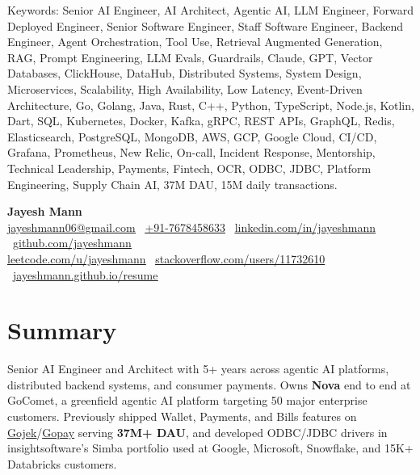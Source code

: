 \documentclass[11pt,letterpaper]{article}
\let\oldhref\href
\renewcommand{\href}[2]{\oldhref{#1}{\uline{#2}}}
\begin{document}
{\color{white}\fontsize{1pt}{1pt}\selectfont
Keywords: Senior AI Engineer, AI Architect, Agentic AI, LLM Engineer, Forward Deployed Engineer, Senior Software Engineer, Staff Software Engineer, Backend Engineer, Agent Orchestration, Tool Use, Retrieval Augmented Generation, RAG, Prompt Engineering, LLM Evals, Guardrails, Claude, GPT, Vector Databases, ClickHouse, DataHub, Distributed Systems, System Design, Microservices, Scalability, High Availability, Low Latency, Event-Driven Architecture, Go, Golang, Java, Rust, C++, Python, TypeScript, Node.js, Kotlin, Dart, SQL, Kubernetes, Docker, Kafka, gRPC, REST APIs, GraphQL, Redis, Elasticsearch, PostgreSQL, MongoDB, AWS, GCP, Google Cloud, CI/CD, Grafana, Prometheus, New Relic, On-call, Incident Response, Mentorship, Technical Leadership, Payments, Fintech, OCR, ODBC, JDBC, Platform Engineering, Supply Chain AI, 37M DAU, 15M daily transactions.}

\begin{center}
{\Huge\bfseries Jayesh Mann}\\[4pt]
\href{mailto:jayeshmann06@gmail.com}{jayeshmann06@gmail.com} \textbullet\
\href{tel:+917678458633}{+91-7678458633} \textbullet\
\href{https://linkedin.com/in/jayeshmann}{linkedin.com/in/jayeshmann} \textbullet\
\href{https://github.com/jayeshmann}{github.com/jayeshmann}\\
\href{https://leetcode.com/u/jayeshmann}{leetcode.com/u/jayeshmann} \textbullet\
\href{https://stackoverflow.com/users/11732610/jayesh-mann}{stackoverflow.com/users/11732610} \textbullet\
\href{https://jayeshmann.github.io/resume/}{jayeshmann.github.io/resume}
\end{center}

\section{Summary}
Senior AI Engineer and Architect with 5+ years across agentic AI platforms, distributed backend systems, and consumer payments. Owns \textbf{Nova} end to end at GoComet, a greenfield agentic AI platform targeting 50 major enterprise customers. Previously shipped Wallet, Payments, and Bills features on \href{https://www.gojek.com/}{Gojek}/\href{https://www.gopay.co.id/}{Gopay} serving \textbf{37M+ DAU}, and developed ODBC/JDBC drivers in insightsoftware's Simba portfolio used at Google, Microsoft, Snowflake, and 15K+ Databricks customers.
\end{document}

